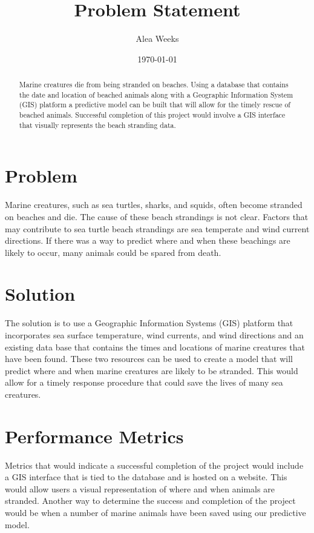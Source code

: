 \documentclass[letterpaper,12pt]{article}
\begin{document}
\title{Problem Statement}
\author{Alea Weeks}
\date{\today}
\maketitle

\begin{abstract}
Marine creatures die from being stranded on beaches. Using a database that contains the date and location of beached animals along with a Geographic Information System (GIS) platform a predictive model can be built that will allow for the timely rescue of beached animals. Successful completion of this project would involve a GIS interface that visually represents the beach stranding data.
\end{abstract}


\section{Problem}

Marine creatures, such as sea turtles, sharks, and squids, often become stranded on beaches and die. The cause of these beach strandings is not clear. Factors that may contribute to sea turtle beach strandings are sea temperate and wind current directions. If there was a way to predict where and when these beachings are likely to occur, many animals could be spared from death.


\section{Solution}

The solution is to use a Geographic Information Systems (GIS) platform that incorporates sea surface temperature, wind currents, and wind directions and an existing data base that contains the times and locations of marine creatures that have been found. These two resources can be used to create a model that will predict where and when marine creatures are likely to be stranded. This would allow for a timely response procedure that could save the lives of many sea creatures.


\section{Performance Metrics}

Metrics that would indicate a successful completion of the project would include a GIS interface that is tied to the database and is hosted on a website. This would allow users a visual representation of where and when animals are stranded. Another way to determine the success and completion of the project would be when a number of marine animals have been saved using our predictive model.


\nocite{*} %


\end{document}
